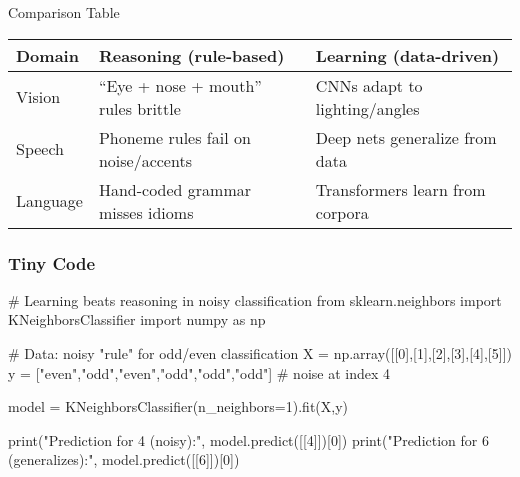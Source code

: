 \documentclass[
  letterpaper,
  DIV=11,
  numbers=noendperiod]{scrreprt}
\newenvironment{Shaded}{\begin{snugshade}}{\end{snugshade}}
\newcommand{\BuiltInTok}[1]{\textcolor[rgb]{0.00,0.23,0.31}{#1}}
\newcommand{\CommentTok}[1]{\textcolor[rgb]{0.37,0.37,0.37}{#1}}
\newcommand{\DecValTok}[1]{\textcolor[rgb]{0.68,0.00,0.00}{#1}}
\newcommand{\ImportTok}[1]{\textcolor[rgb]{0.00,0.46,0.62}{#1}}
\newcommand{\NormalTok}[1]{\textcolor[rgb]{0.00,0.23,0.31}{#1}}
\newcommand{\OperatorTok}[1]{\textcolor[rgb]{0.37,0.37,0.37}{#1}}
\newcommand{\StringTok}[1]{\textcolor[rgb]{0.13,0.47,0.30}{#1}}
\begin{document}
Comparison Table

\begin{longtable}[]{@{}
  >{\raggedright\arraybackslash}p{}
  >{\raggedright\arraybackslash}p{}
  >{\raggedright\arraybackslash}p{}@{}}
\toprule\noalign{}
\begin{minipage}[b]{\linewidth}\raggedright
Domain
\end{minipage} & \begin{minipage}[b]{\linewidth}\raggedright
Reasoning (rule-based)
\end{minipage} & \begin{minipage}[b]{\linewidth}\raggedright
Learning (data-driven)
\end{minipage} \\
\midrule\noalign{}
\endhead
\bottomrule\noalign{}
\endlastfoot
Vision & ``Eye + nose + mouth'' rules brittle & CNNs adapt to
lighting/angles \\
Speech & Phoneme rules fail on noise/accents & Deep nets generalize from
data \\
Language & Hand-coded grammar misses idioms & Transformers learn from
corpora \\
\end{longtable}

\subsubsection{Tiny Code}\label{tiny-code-55}

\begin{Shaded}
\begin{Highlighting}[]
\CommentTok{\# Learning beats reasoning in noisy classification}
\ImportTok{from}\NormalTok{ sklearn.neighbors }\ImportTok{import}\NormalTok{ KNeighborsClassifier}
\ImportTok{import}\NormalTok{ numpy }\ImportTok{as}\NormalTok{ np}

\CommentTok{\# Data: noisy "rule" for odd/even classification}
\NormalTok{X }\OperatorTok{=}\NormalTok{ np.array([[}\DecValTok{0}\NormalTok{],[}\DecValTok{1}\NormalTok{],[}\DecValTok{2}\NormalTok{],[}\DecValTok{3}\NormalTok{],[}\DecValTok{4}\NormalTok{],[}\DecValTok{5}\NormalTok{]])}
\NormalTok{y }\OperatorTok{=}\NormalTok{ [}\StringTok{"even"}\NormalTok{,}\StringTok{"odd"}\NormalTok{,}\StringTok{"even"}\NormalTok{,}\StringTok{"odd"}\NormalTok{,}\StringTok{"odd"}\NormalTok{,}\StringTok{"odd"}\NormalTok{]  }\CommentTok{\# noise at index 4}

\NormalTok{model }\OperatorTok{=}\NormalTok{ KNeighborsClassifier(n\_neighbors}\OperatorTok{=}\DecValTok{1}\NormalTok{).fit(X,y)}

\BuiltInTok{print}\NormalTok{(}\StringTok{"Prediction for 4 (noisy):"}\NormalTok{, model.predict([[}\DecValTok{4}\NormalTok{]])[}\DecValTok{0}\NormalTok{])}
\BuiltInTok{print}\NormalTok{(}\StringTok{"Prediction for 6 (generalizes):"}\NormalTok{, model.predict([[}\DecValTok{6}\NormalTok{]])[}\DecValTok{0}\NormalTok{])}
\end{Highlighting}
\end{Shaded}
\end{document}
